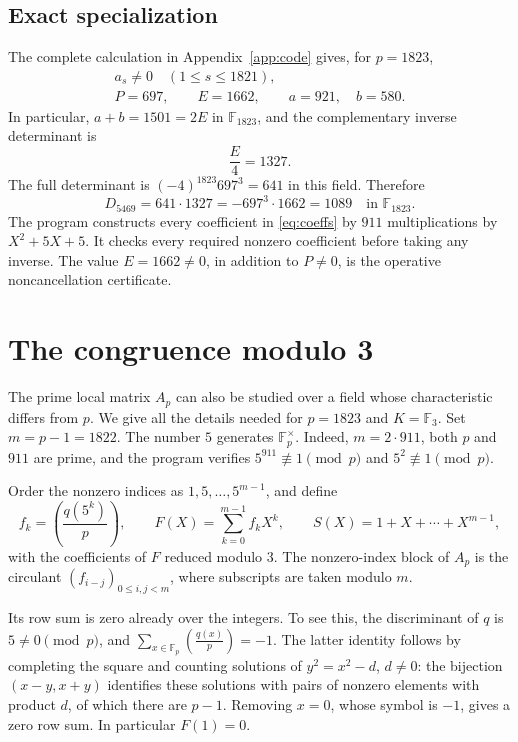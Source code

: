 \documentclass[11pt,a4paper]{article}
\theoremstyle{remark}
\newcommand{\F}{\mathbb F}
\newcommand{\jac}[2]{\left(\frac{#1}{#2}\right)}
\begin{document}
\subsection{Exact specialization}
The complete calculation in Appendix~\ref{app:code} gives, for \(p=1823\),
\begin{equation}\label{eq:prime-data}
\begin{gathered}
a_s\ne0\quad(1\le s\le1821),\\
P=697,\qquad E=1662,\qquad
a=921,\quad b=580.
\end{gathered}
\end{equation}
In particular, \(a+b=1501=2E\) in \(\F_{1823}\), and the
complementary inverse determinant is
\[
\frac E4=1327.
\]
The full determinant is
\((-4)^{1823}697^3=641\) in this field. Therefore
\[
D_{5469}=641\cdot1327
=-697^3\cdot1662
=1089\quad\text{in }\F_{1823}.
\]
The program constructs every coefficient in \eqref{eq:coeffs}
by \(911\) multiplications by \(X^2+5X+5\).
It checks every required nonzero coefficient before taking any inverse.
The value \(E=1662\ne0\), in addition to \(P\ne0\), is the
operative noncancellation certificate.

\section{The congruence modulo 3}\label{sec:sun-three}

The prime local matrix \(A_p\) can also be studied over a field whose
characteristic differs from \(p\). We give all the details needed
for \(p=1823\) and \(K=\F_3\).
Set \(m=p-1=1822\). The number \(5\) generates \(\F_p^\times\).
Indeed, \(m=2\cdot911\), both \(p\) and \(911\) are prime, and
the program verifies \(5^{911}\not\equiv1\pmod p\) and
\(5^2\not\equiv1\pmod p\).

Order the nonzero indices as \(1,5,\ldots,5^{m-1}\), and define
\begin{equation}\label{eq:circulant}
f_k=\jac{q(5^k)}p,\qquad
F(X)=\sum_{k=0}^{m-1}f_kX^k,\qquad
S(X)=1+X+\cdots+X^{m-1},
\end{equation}
with the coefficients of \(F\) reduced modulo \(3\).
The nonzero-index block of \(A_p\) is the circulant
\((f_{i-j})_{0\le i,j<m}\), where subscripts are taken modulo \(m\).

Its row sum is zero already over the integers. To see this,
the discriminant of \(q\) is \(5\ne0\pmod p\), and
\(\sum_{x\in\F_p}\jac{q(x)}p=-1\).
The latter identity follows by completing the square and counting
solutions of \(y^2=x^2-d\), \(d\ne0\): the bijection
\((x-y,x+y)\) identifies these solutions with pairs of nonzero
elements with product \(d\), of which there are \(p-1\).
Removing \(x=0\), whose symbol is \(-1\), gives a zero row sum.
In particular \(F(1)=0\).
\end{document}

